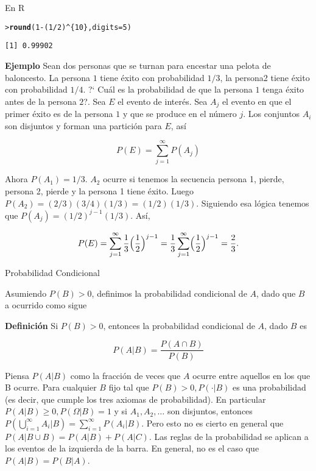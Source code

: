 \documentclass{article}\usepackage[]{graphicx}\usepackage[]{color}
\makeatletter
\newcommand{\hlnum}[1]{\textcolor[rgb]{0.686,0.059,0.569}{#1}}%
\newcommand{\hlopt}[1]{\textcolor[rgb]{0,0,0}{#1}}%
\newcommand{\hlstd}[1]{\textcolor[rgb]{0.345,0.345,0.345}{#1}}%
\newcommand{\hlkwc}[1]{\textcolor[rgb]{0.333,0.667,0.333}{#1}}%
\newcommand{\hlkwd}[1]{\textcolor[rgb]{0.737,0.353,0.396}{\textbf{#1}}}%
\newenvironment{kframe}{%
 \def\at@end@of@kframe{}%
 \ifinner\ifhmode%
  \def\at@end@of@kframe{\end{minipage}}%
  \begin{minipage}{\columnwidth}%
 \fi\fi%
 \def\FrameCommand##1{\hskip\@totalleftmargin \hskip-\fboxsep
 \colorbox{shadecolor}{##1}\hskip-\fboxsep
     \hskip-\linewidth \hskip-\@totalleftmargin \hskip\columnwidth}%
 \MakeFramed {\advance\hsize-\width
   \@totalleftmargin\z@ \linewidth\hsize
   \@setminipage}}%
 {\par\unskip\endMakeFramed%
 \at@end@of@kframe}
\newenvironment{knitrout}{}{} %
\makeatother
\begin{document}
En R

\begin{knitrout}
\color{fgcolor}\begin{kframe}
\begin{alltt}
\hlstd{> }\hlkwd{round} \hlstd{(}\hlnum{1} \hlopt{-}\hlstd{(}\hlnum{1}\hlopt{/}\hlnum{2}\hlstd{)}\hlopt{^}\hlstd{\{}\hlnum{10}\hlstd{\},} \hlkwc{digits} \hlstd{=} \hlnum{5}\hlstd{)}
\end{alltt}
\begin{verbatim}
[1] 0.99902
\end{verbatim}
\end{kframe}
\end{knitrout}

\textbf{Ejemplo} Sean dos personas que se turnan para encestar una pelota de baloncesto. La persona $1$ tiene \'exito con probabilidad $1/3$, la  persona2 tiene \'exito con probabilidad $1/4$. ?` Cu\'al es la probabilidad de que la persona $1$ tenga  \'exito antes de la  persona $2$?. Sea $E$  el evento de inter\'es. Sea $A_j$ el evento en  que el primer \'exito es de la  persona $1$ y que se produce en el n\'umero $j$. Los conjuntos $A_i$ son disjuntos y forman una partici\'on para $E$, as\'i

\[
P(E) = \sum_{j = 1}^{\infty}P(A_j)
\]

Ahora $P(A_1) = 1/3$. $A_2$ ocurre si tenemos la secuencia persona 1, pierde, persona 2, pierde y la persona 1 tiene \'exito. Luego $P(A_2) = (2/3)(3/4)(1/3) = (1/2)(1/3)$. Siguiendo esa l\'ogica tenemos que $P(A_j) = (1/2)^{j -1}(1/3)$. As\'i,

\[
P(E) = \sum_{j  =1}^{\infty}\frac{1}{3}\Bigl(\frac{1}{2}\Bigr)^{j -1} = \frac{1}{3}\sum_{j = 1}^{\infty}\Bigl(\frac{1}{2}\Bigr)^{j -1} = \frac{2}{3}.
\]


\newpage


{\large Probabilidad Condicional}

\vspace{0.5cm}

Asumiendo $P(B) > 0$, definimos la probabilidad condicional de $A$, dado que $B$ a ocurrido como sigue

\vspace{0.3cm}

\textbf{Definici\'on} Si $P(B) > 0$, entonces  la probabilidad condicional de $A$, dado  $B$ es

\[
P(A|B ) = \frac{P(A \cap B)}{P(B)}
\]


Piensa $P(A|B)$ como la fracci\'on de veces que $A$  ocurre entre aquellos en los que
B ocurre. Para cualquier $B$ fijo  tal que  $P (B)> 0, P (\cdot| B)$ es una probabilidad (es decir, que cumple los tres axiomas de probabilidad). En particular $P(A|B) \geq 0, P(\Omega|B) = 1$ y si $A_1,A_2, \dots $ son disjuntos, entonces $P(\bigcup\limits_{i= 1}^{\infty}A_i|B)= \sum_{i = 1}^{\infty}P(A_i|B)$. Pero esto no es cierto en general que $P(A|B \cup B) = P(A|B) + P(A|C)$. Las reglas de la probabilidad se aplican a los eventos de la izquierda de la barra. En general, no es el caso que $P(A|B) = P(B|A)$.
\end{document}
